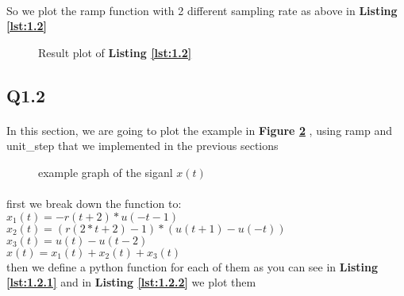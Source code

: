 \vspace{2ex}
 
 \paragraph{}So we plot the ramp function with 2 different
 sampling rate as above in \textbf{Listing \ref{lst:1.2}}
 
 \vspace{2ex}
 
 \begin{figure}[H]
    \resizebox{\textwidth}{!}{}
    \caption{Result plot of \textbf{Listing \ref{lst:1.2}}}
    \label{fig:2.2}
\end{figure}


\subsection{Q1.2}
\paragraph{}In this section, we are going to plot the example in \textbf{Figure \ref{fig:ex1}}
, using ramp and unit\_step that we implemented in the previous sections

\begin{figure}[H]
    \centering
   \caption{example graph of the siganl $x(t)$}
     \label{fig:ex1}
   \end{figure}

\paragraph{} first we break down the function to:
\\$x_1(t)=-r(t+2) * u(-t-1)$
\\$x_2(t)=(r(2*t+2)-1) *(u(t+1)-u(-t))$
\\$x_3(t)=u(t) -u(t-2)$
\\$x(t) = x_1(t)+x_2(t)+x_3(t)$\\
then we define a python function for each of them as you can
see in \textbf{Listing \ref{lst:1.2.1}} and in \textbf{Listing \ref{lst:1.2.2}}
we plot them 

